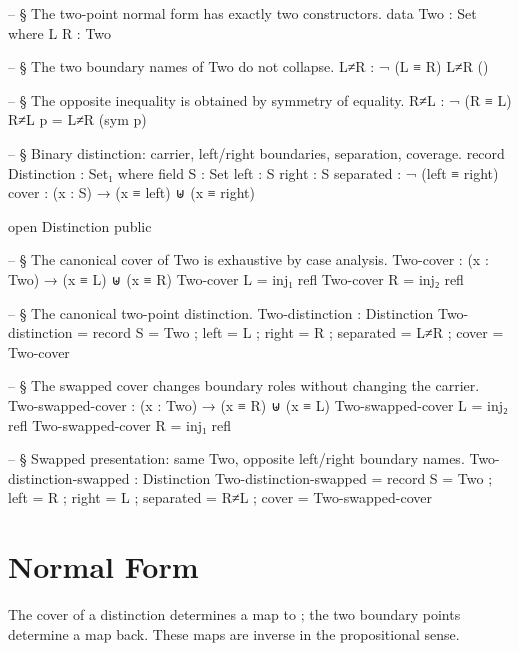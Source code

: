 \documentclass[11pt]{article}
\begin{document}
\begin{code}
-- § The two-point normal form has exactly two constructors.
data Two : Set where
  L R : Two

-- § The two boundary names of Two do not collapse.
L≠R : ¬ (L ≡ R)
L≠R ()

-- § The opposite inequality is obtained by symmetry of equality.
R≠L : ¬ (R ≡ L)
R≠L p = L≠R (sym p)

-- § Binary distinction: carrier, left/right boundaries, separation, coverage.
record Distinction : Set₁ where
  field
    S         : Set
    left      : S
    right     : S
    separated : ¬ (left ≡ right)
    cover     : (x : S) → (x ≡ left) ⊎ (x ≡ right)

open Distinction public

-- § The canonical cover of Two is exhaustive by case analysis.
Two-cover : (x : Two) → (x ≡ L) ⊎ (x ≡ R)
Two-cover L = inj₁ refl
Two-cover R = inj₂ refl

-- § The canonical two-point distinction.
Two-distinction : Distinction
Two-distinction = record
  { S         = Two
  ; left      = L
  ; right     = R
  ; separated = L≠R
  ; cover     = Two-cover
  }

-- § The swapped cover changes boundary roles without changing the carrier.
Two-swapped-cover : (x : Two) → (x ≡ R) ⊎ (x ≡ L)
Two-swapped-cover L = inj₂ refl
Two-swapped-cover R = inj₁ refl

-- § Swapped presentation: same Two, opposite left/right boundary names.
Two-distinction-swapped : Distinction
Two-distinction-swapped = record
  { S         = Two
  ; left      = R
  ; right     = L
  ; separated = R≠L
  ; cover     = Two-swapped-cover
  }
\end{code}

\section{Normal Form}

The cover of a distinction determines a map to ; the
two boundary points determine a map back.  These maps are inverse in the
propositional sense.
\end{document}
